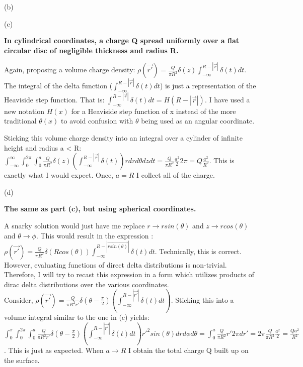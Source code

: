 \begin{homeworkProblem}
\begin{homeworkSection}{(b)}
\end{homeworkSection}

\begin{homeworkSection}{(c)}

\textbf{In cylindrical coordinates, a charge Q spread uniformly over a flat circular 
disc of negligible thickness and radius R. }

Again, proposing a volume charge density: $\rho(\vec{r'}) = \frac{Q}{\pi R^2} \delta(z) \int_{-\infty}^{R-|\vec{r}|}\delta(t) dt$. The integral of the delta function ($ \int_{-\infty}^{R-|\vec{r}|}\delta(t) dt $) is just a representation of the Heaviside step function. That is: $\int_{-\infty}^{R-|\vec{r}|}\delta(t) dt = H(R-|\vec{r}|)$. I have used a new notation $H(x)$ for a Heaviside step function of x instead of the more traditional $\theta(x)$ to avoid confusion with $\theta$ being used as an angular coordinate.

Sticking this volume charge density into an integral over a cylinder of infinite height and radius a < R: $\int_{-\infty}^\infty \int_0^{2\pi} \int_0^a  \frac{Q}{\pi R^2} \delta(z) (\int_{-\infty}^{R-|\vec{r}|}\delta(t) ) r dr d\theta dz dt = \frac{Q}{\pi R^2} \frac{a^2}{2} 2\pi = Q \frac{a^2}{R^2}$. This is exactly what I would expect. Once, $a = R$ I collect all of the charge. 

\end{homeworkSection}

\begin{homeworkSection}{(d)}

\textbf{The same as part (c), but using spherical coordinates.}

A snarky solution would just have me replace $r \rightarrow r sin(\theta)$ and $z \rightarrow r cos(\theta)$ and $\theta \rightarrow \phi$. This would result in the expression : $\rho(\vec{r'}) = \frac{Q}{\pi R^2} \delta(R cos(\theta)) \int_{-\infty}^{R-|\vec{r sin(\theta)}|}\delta(t) dt$. Technically, this is correct. However, evaluating functions of direct delta distributions is non-trivial. Therefore, I will try to recast this expression in a form which utilizes products of dirac delta distributions over the various coordinates.
\\
Consider, $\rho(\vec{r'}) = \frac{Q}{\pi R^2 r'} \delta(\theta - \frac{\pi}{2}) (\int_{-\infty}^{R-|\vec{r'}|} \delta(t) dt)$. Sticking this into a volume integral similar to the one in (c) yields: $\int_0^\pi \int_0^{2\pi} \int_0^a \frac{Q}{\pi R^2 r'}\delta(\theta - \frac{\pi}{2}) (\int_{-\infty}^{R-|\vec{r'}|} \delta(t) dt) r'^2 sin(\theta) dr d\phi d\theta = \int_0^a \frac{Q}{\pi R^2} r' 2\pi dr' = 2\pi \frac{Q}{\pi R^2} \frac{a^2}{2} = \frac{Qa^2}{R^2}$. This is just as expected. When $a \rightarrow R$ I obtain the total charge Q built up on the surface. 

\end{homeworkSection}

\end{homeworkProblem}